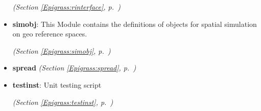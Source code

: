 \begin{itemize}
  \textit{(Section \ref{Epigrass:rinterface}, p.~\pageref{Epigrass:rinterface})}

\item \textbf{simobj}: This Module contains the definitions of objects for spatial simulation on 
geo reference spaces.



  \textit{(Section \ref{Epigrass:simobj}, p.~\pageref{Epigrass:simobj})}

\item \textbf{spread}
  \textit{(Section \ref{Epigrass:spread}, p.~\pageref{Epigrass:spread})}

\item \textbf{testinst}: Unit testing script



  \textit{(Section \ref{Epigrass:testinst}, p.~\pageref{Epigrass:testinst})}

\end{itemize}

